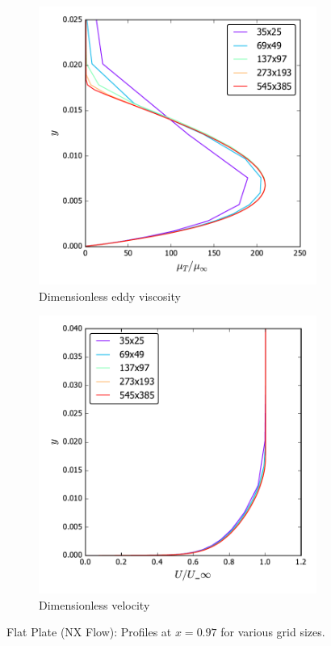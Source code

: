\begin{figure}[ht!]
\centering
\begin{subfigure}{.45\textwidth}
  \centering
  \includegraphics[width=1.0\textwidth]{figs/flatnx/mut_gridstudy.pdf}
  \caption{Dimensionless eddy viscosity}
\end{subfigure}%
\begin{subfigure}{.45\textwidth}
  \centering
  \includegraphics[width=1.0\textwidth]{figs/flatnx/u_x097_gridstudy.pdf}
  \caption{Dimensionless velocity}
\end{subfigure}
\caption{Flat Plate (NX Flow): Profiles at $x=0.97$ for various grid sizes.}
\label{fig:nxflatprofilestudy}
\end{figure}
